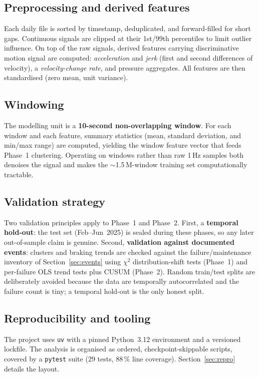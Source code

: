 \documentclass[11pt,a4paper]{article}
\begin{document}
\subsection{Preprocessing and derived features}
Each daily file is sorted by timestamp, deduplicated, and forward-filled for short gaps.
Continuous signals are clipped at their 1st/99th percentiles to limit outlier influence.
On top of the raw signals, derived features carrying discriminative motion signal are
computed: \emph{acceleration} and \emph{jerk} (first and second differences of velocity),
a \emph{velocity-change rate}, and pressure aggregates. All features are then
standardised (zero mean, unit variance).

\subsection{Windowing}
The modelling unit is a \textbf{10-second non-overlapping window}. For each window and
each feature, summary statistics (mean, standard deviation, and min/max range) are
computed, yielding the window feature vector that feeds Phase~1 clustering. Operating on
windows rather than raw 1\,Hz samples both denoises the signal and makes the
$\sim$1.5\,M-window training set computationally tractable.

\subsection{Validation strategy}
Two validation principles apply to Phase~1 and Phase~2. First, a \textbf{temporal
hold-out}: the test set (Feb--Jun~2025) is sealed during these phases, so any later
out-of-sample claim is genuine. Second, \textbf{validation against documented events}:
clusters and braking trends are checked against the failure/maintenance inventory of
Section~\ref{sec:events} using $\chi^2$ distribution-shift tests (Phase~1) and per-failure
OLS trend tests plus CUSUM (Phase~2). Random train/test splits are deliberately avoided
because the data are temporally autocorrelated and the failure count is tiny; a temporal
hold-out is the only honest split.

\subsection{Reproducibility and tooling}
The project uses \texttt{uv} with a pinned Python~3.12 environment and a versioned
lockfile. The analysis is organised as ordered, checkpoint-skippable scripts, covered by
a \texttt{pytest} suite (29 tests, 88\,\% line coverage). Section~\ref{sec:repro}
details the layout.
\end{document}
